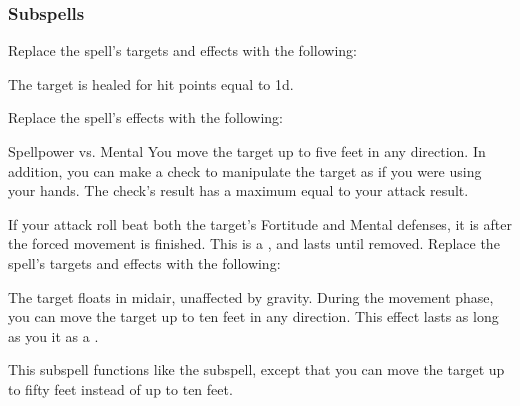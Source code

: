 \subsubsection{Subspells}
Replace the spell's targets and effects with the following:
\begin{spellcontent}
\begin{augmenttargetinginfo}
\end{augmenttargetinginfo}
\begin{augmenteffects}
\spelleffect
The target is healed for hit points equal to  \plus1d.
\end{augmenteffects}
\end{spellcontent}
Replace the spell's effects with the following:
\begin{spellcontent}
\begin{augmenteffects}
\begin{spellattack}{Spellpower vs. Mental}
\spellsuccess
You move the target up to five feet in any direction.
In addition, you can make a check to manipulate the target as if you were using your hands.
The check's result has a maximum equal to your attack result.
\end{spellattack}
\end{augmenteffects}
\end{spellcontent}
If your attack roll beat both the target's Fortitude and Mental defenses, it is \immobilized after the forced movement is finished.
This is a , and lasts until removed.
Replace the spell's targets and effects with the following:
\begin{spellcontent}
\begin{augmenttargetinginfo}
\end{augmenttargetinginfo}
\begin{augmenteffects}
\spelleffect
The target floats in midair, unaffected by gravity.
During the movement phase, you can move the target up to ten feet in any direction.
This effect lasts as long as you  it as a .
\end{augmenteffects}
\end{spellcontent}
This subspell functions like the  subspell, except that you can move the target up to fifty feet instead of up to ten feet.

